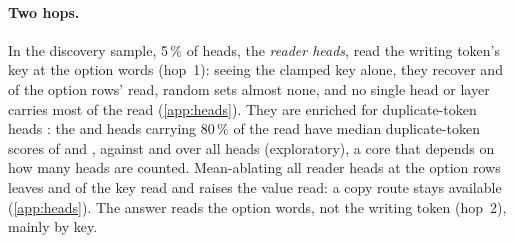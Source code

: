 \paragraph{Two hops.}
In the discovery sample, 5\,\% of heads, the \emph{reader heads}, read the writing token's key at the option words (hop~1): seeing the clamped key alone, they recover \HoneRQwenSeven{} and \HoneRMistralSeven{} of the option rows' read, random sets almost none, and no single head or layer carries most of the read (\cref{app:heads}). They are enriched for duplicate-token heads \citep{wang2022ioi}: the \HfourKCQwenSeven{} and \HfourKCMistralSeven{} heads carrying 80\,\% of the read have median duplicate-token scores of \HfourDQwenSeven{} and \HfourDMistralSeven{}, against \HfourDwholeQwenSeven{} and \HfourDwholeMistralSeven{} over all heads (exploratory), a core that depends on how many heads are counted. Mean-ablating all reader heads at the option rows leaves \HthreeRhoQwenSeven{} and \HthreeRhoMistralSeven{} of the key read and raises the value read: a copy route stays available (\cref{app:heads}). The answer reads the option words, not the writing token (hop~2), mainly by key.

